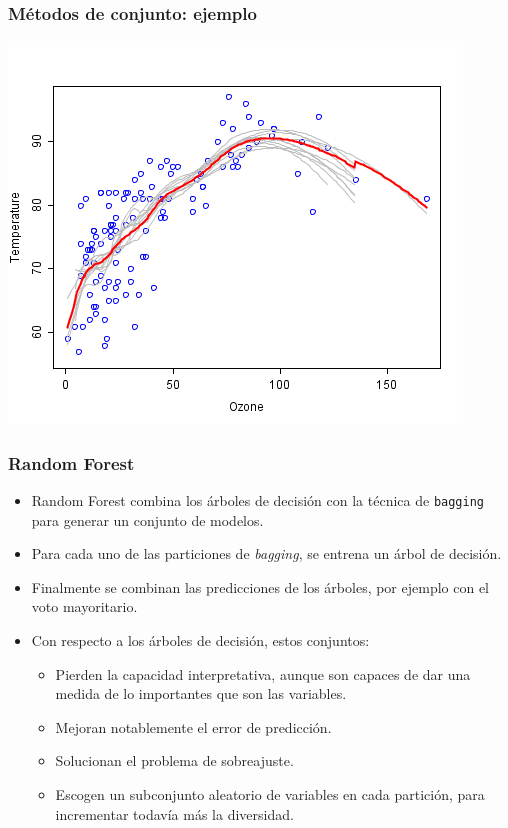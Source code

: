 \documentclass{beamer}
\begin{document}
\begin{frame}
\frametitle{Métodos de conjunto: ejemplo}

\centering
\includegraphics[height=0.85\textheight]{Ozone.png}
\end{frame}

\begin{frame}
\frametitle{Random Forest}

\begin{itemize}
\item Random Forest combina los árboles de decisión con la técnica de \texttt{bagging} para generar un conjunto de modelos.
\item Para cada uno de las particiones de \textit{bagging}, se entrena un árbol de decisión.
\item Finalmente se combinan las predicciones de los árboles, por ejemplo con el voto mayoritario.
\item Con respecto a los árboles de decisión, estos conjuntos:
\begin{itemize}
\item Pierden la capacidad interpretativa, aunque son capaces de dar una medida de lo importantes que son las variables.
\item Mejoran notablemente el error de predicción.
\item Solucionan el problema de sobreajuste.
\item Escogen un subconjunto aleatorio de variables en cada partición, para incrementar todavía más la diversidad.
\end{itemize}
\end{itemize}
\end{frame}
\end{document}
